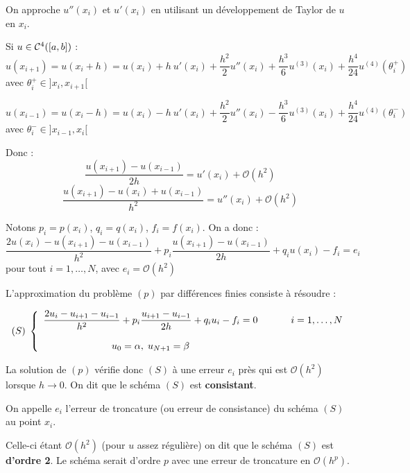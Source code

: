 On approche $u''(x_i)$ et $u'(x_i)$ en utilisant un développement de Taylor
de $u$ en $x_i$.

Si $u \in \mathcal{C}^4([a,b])$ :
\[
    u(x_{i+1}) = u(x_i + h) = u(x_i) + h \: u'(x_i) + \frac{h^2}{2} u''(x_i)
    + \frac{h^3}{6} u^{(3)}(x_i) + \frac{h^4}{24} u^{(4)}(\theta_i^+)
\]
\hfill avec $\theta_i^+ \in ]x_i,x_{i+1}[$

\[
    u(x_{i-1}) = u(x_i - h) = u(x_i) - h \: u'(x_i) + \frac{h^2}{2} u''(x_i)
    - \frac{h^3}{6} u^{(3)}(x_i) + \frac{h^4}{24} u^{(4)}(\theta_i^-)
\]
\hfill avec $\theta_i^- \in ]x_{i-1},x_i[$

    Donc :
    \[
        \frac{u(x_{i+1}) - u(x_{i-1})}{2h} =  u'(x_i) + \mathcal{O}(h^2)
    \]
    \[
        \frac{u(x_{i+1}) - u(x_i) + u(x_{i-1})}{h^2} =  u''(x_i) + \mathcal{O}(h^2)
    \]

    Notons $p_i = p(x_i)$, $q_i = q(x_i)$, $f_i = f(x_i)$. On a donc :
    \[
        \frac{2u(x_i) - u(x_{i+1}) - u(x_{i-1})}{h^2} + p_i \frac{u(x_{i+1}) - u(x_{i-1})}{2h} + q_i u(x_i) - f_i = e_i
    \]
    \hfill pour tout $i=1,\dots,N$, avec $e_i = \mathcal{O}(h^2)$

    L'approximation du problème $(p)$ par différences finies consiste à
    résoudre :

    \[
        (S) \;
        \left\lbrace
        \begin{array}{ccc}
            \dfrac{2u_i - u_{i+1} - u_{i-1}}{h^2} + p_i \dfrac{u_{i+1} - u_{i-1}}{2h} + q_i u_i - f_i = 0 & & \hspace{0.5cm} i=1,\dots,N \\ [15pt]
            u_0 = \alpha, \; u_{N+1} = \beta & &
        \end{array}
        \right.
    \]

    La solution de $(p)$ vérifie donc $(S)$ à une erreur $e_i$ près qui est
    $\mathcal{O}(h^2)$ lorsque $h \longrightarrow 0$. On dit que le schéma
    $(S)$ est \textbf{consistant}.

    On appelle $e_i$ l'erreur de troncature (ou erreur de consistance) du schéma
    $(S)$ au point $x_i$.

    Celle-ci étant $\mathcal{O}(h^2)$ (pour $u$ assez régulière) on dit que le schéma
    $(S)$ est \textbf{d'ordre 2}. Le schéma serait d'ordre $p$ avec une erreur
    de troncature en $\mathcal{O}(h^p)$.

